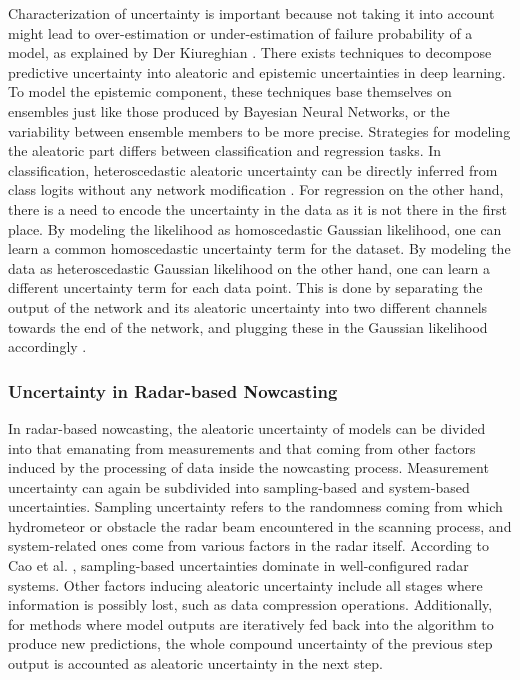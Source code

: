 Characterization of uncertainty is important because not taking it into account might lead to over-estimation or under-estimation of failure probability of a model, as explained by Der Kiureghian \cite{kiureghian_aleatory_2009}. 
There exists techniques to decompose predictive uncertainty into aleatoric and epistemic uncertainties in deep learning. To model the epistemic component, these techniques base themselves on ensembles just like those produced by Bayesian Neural Networks, or the variability between ensemble members to be more precise. Strategies for modeling the aleatoric part differs between classification and regression tasks. In classification, heteroscedastic aleatoric uncertainty can be directly inferred from class logits without any network modification \cite{shridhar_comprehensive_2019, kwon_uncertainty_2020}. For regression on the other hand, there is a need to encode the uncertainty in the data as it is not there in the first place. By modeling the likelihood as homoscedastic Gaussian likelihood, one can learn a common homoscedastic uncertainty term for the dataset. By modeling the data as heteroscedastic Gaussian likelihood on the other hand, one can learn a different uncertainty term for each data point. This is done by separating the output of the network and its aleatoric uncertainty into two different channels towards the end of the network, and plugging these in the Gaussian likelihood accordingly \cite{kendall_what_2017}.

\subsubsection*{Uncertainty in Radar-based Nowcasting}

In radar-based nowcasting, the aleatoric uncertainty of models can be divided into that emanating from measurements and that coming from other factors induced by the processing of data inside the nowcasting process. Measurement uncertainty can again be subdivided into sampling-based and system-based uncertainties. Sampling uncertainty refers to the randomness coming from which hydrometeor or obstacle the radar beam encountered in the scanning process, and system-related ones come from various factors in the radar itself. According to Cao et al. \cite{cao_measurement_2016}, sampling-based uncertainties dominate in well-configured radar systems. Other factors inducing aleatoric uncertainty include all stages where information is possibly lost, such as data compression operations. Additionally, for methods where model outputs are iteratively fed back into the algorithm to produce new predictions, the whole compound uncertainty of the previous step output is accounted as aleatoric uncertainty in the next step. 



